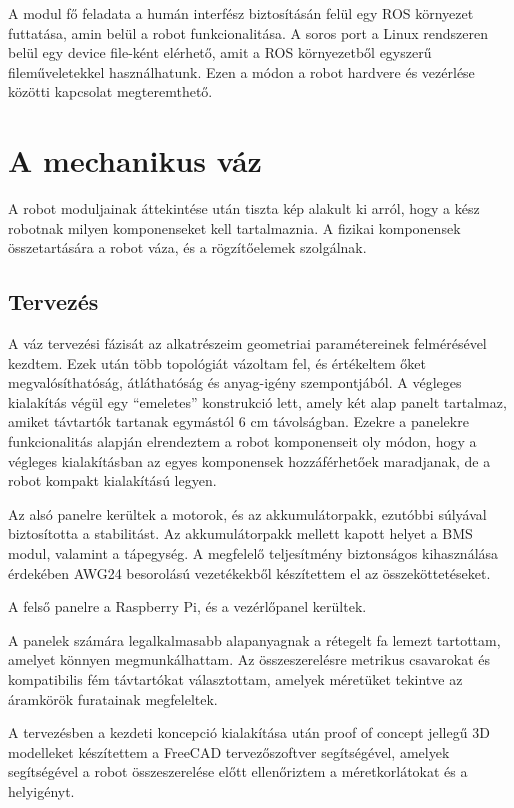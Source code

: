 \medskip

A modul fő feladata a humán interfész biztosításán felül egy ROS környezet
futtatása, amin belül a robot funkcionalitása. A soros port a Linux rendszeren
belül egy device file-ként elérhető, amit a ROS környezetből egyszerű
fileműveletekkel használhatunk. Ezen a módon a robot hardvere és vezérlése
közötti kapcsolat megteremthető.\cite{rpisource}

\section{A mechanikus váz}

A robot moduljainak áttekintése után tiszta kép alakult ki arról, hogy a kész
robotnak milyen komponenseket kell tartalmaznia. A fizikai komponensek
összetartására a robot váza, és a rögzítőelemek szolgálnak. 

\subsection{Tervezés}

A váz tervezési fázisát az alkatrészeim geometriai paramétereinek felmérésével
kezdtem. Ezek után több topológiát vázoltam fel, és értékeltem őket
megvalósíthatóság, átláthatóság és anyag-igény szempontjából. A végleges
kialakítás végül egy ``emeletes'' konstrukció lett, amely két alap panelt
tartalmaz, amiket távtartók tartanak egymástól 6 cm távolságban. Ezekre a
panelekre funkcionalitás alapján elrendeztem a robot komponenseit oly módon, hogy
a végleges kialakításban az egyes komponensek hozzáférhetőek maradjanak, de a
robot kompakt kialakítású legyen.

Az alsó panelre kerültek a motorok, és az akkumulátorpakk, ezutóbbi súlyával
biztosította a stabilitást. Az akkumulátorpakk mellett kapott helyet a BMS modul,
valamint a tápegység. A megfelelő teljesítmény biztonságos kihasználása érdekében
AWG24 besorolású vezetékekből készítettem el az összeköttetéseket.

A felső panelre a Raspberry Pi, és a vezérlőpanel kerültek.

A panelek számára legalkalmasabb alapanyagnak a rétegelt fa lemezt tartottam,
amelyet könnyen megmunkálhattam. Az összeszerelésre metrikus csavarokat és
kompatibilis fém távtartókat választottam, amelyek méretüket tekintve az
áramkörök furatainak megfeleltek.

A tervezésben a kezdeti koncepció kialakítása után proof of concept jellegű 
3D modelleket készítettem a FreeCAD tervezőszoftver segítségével, amelyek
segítségével a robot összeszerelése előtt ellenőriztem a méretkorlátokat és a
helyigényt.

